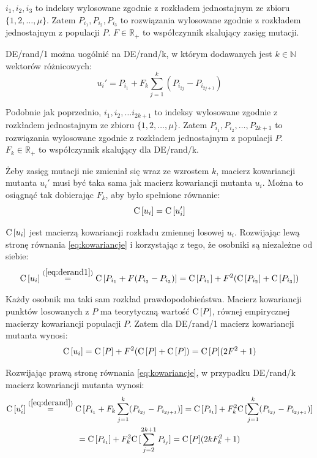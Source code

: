 \documentclass[a4paper,onecolumn,oneside,12pt,wide,floatssmall]{mwrep}
\def\C{{\rm C}\,}
\theoremstyle{definition}
\theoremstyle{plain}%
\theoremstyle{remark}
\begin{document}
$i_1, i_2, i_3$ to indeksy wylosowane zgodnie z rozkładem jednostajnym ze zbioru \\ 
$\{1, 2, \dots, \mu\}$. Zatem $P_{i_1}, P_{i_2}, P_{i_3}$ to rozwiązania wylosowane zgodnie z 
rozkładem jednostajnym z populacji $P$.
$F\in\mathbb{R_+}$ to współczynnik skalujący zasięg mutacji. 

DE/rand/1 można uogólnić na DE/rand/k, w którym dodawanych jest
$k \in \mathbb{N}$ wektorów różnicowych:
\begin{equation} \label{eq:derand}
u_i' = P_{i_1} + F_k\sum\limits_{j=1}^k (P_{i_{2j}} - P_{i_{2j+1}})
\end{equation}

Podobnie jak poprzednio, $i_1, i_2, \dots i_{2k+1}$ to indeksy wylosowane zgodnie z rozkładem jednostajnym ze zbioru 
$\{1, 2, \dots, \mu\}$. Zatem $P_{i_1}, P_{i_2}, \dots, P_{2k+1}$ to rozwiązania wylosowane zgodnie z rozkładem 
jednostajnym z populacji $P$. $F_k\in\mathbb{R_+}$ to współczynnik skalujący dla DE/rand/k. 

Żeby zasięg mutacji nie zmieniał się wraz ze wzrostem $k$, 
macierz kowariancji mutanta $u_i'$ musi być taka sama jak macierz kowariancji mutanta $u_i$.
Można to osiągnąć tak dobierając $F_k$, aby było spełnione równanie:
\begin{equation} \label{eq:kowariancje}
\C[u_i] = \C[u_i']
\end{equation}

$\C[u_i]$ jest macierzą kowariancji rozkładu zmiennej losowej $u_i$.
Rozwijając lewą stronę równania \eqref{eq:kowariancje} i korzystając z tego, że osobniki są niezależne od siebie:
\begin{align*}
\C[u_i] \overset{(\ref{eq:derand1})}{=} \C[P_{i_1} + F(P_{i_2} - P_{i_3})] = \C[P_{i_1}] + F^2(\C[P_{i_2}] + \C[P_{i_3}])
\end{align*}

Każdy osobnik ma taki sam rozkład prawdopodobieństwa. 
Macierz kowariancji punktów losowanych z $P$ ma teorytyczną wartość $\C[P]$,
równej empirycznej macierzy kowariancji populacji $P$.
Zatem dla DE/rand/1 macierz kowariancji mutanta wynosi:
\begin{equation} \label{eq:macierz_kow_mutanta}
\C[u_i] = \C[P] + F^2(\C[P] + \C[P]) = \C[P](2F^2 + 1)
\end{equation}

Rozwijając prawą stronę równania \eqref{eq:kowariancje}, w przypadku DE/rand/k macierz kowariancji mutanta wynosi:
\begin{multline} \label{eq:macierz_kow_mutanta_prim}
\C[u_i'] \overset{(\ref{eq:derand})}{=} \C[P_{i_1} + F_k\sum\limits_{j=1}^k (P_{i_{2j}} - P_{i_{2j+1}})] 
= \C[P_{i_1}] + F_k^2\C[\sum\limits_{j=1}^k (P_{i_{2j}} - P_{i_{2j+1}})] \\
= \C[P_{i_1}] + F_k^2\C[\sum\limits_{j=2}^{2k+1} P_{i_{j}}] = \C[P](2kF_k^2 + 1)
\end{multline}
\end{document}
